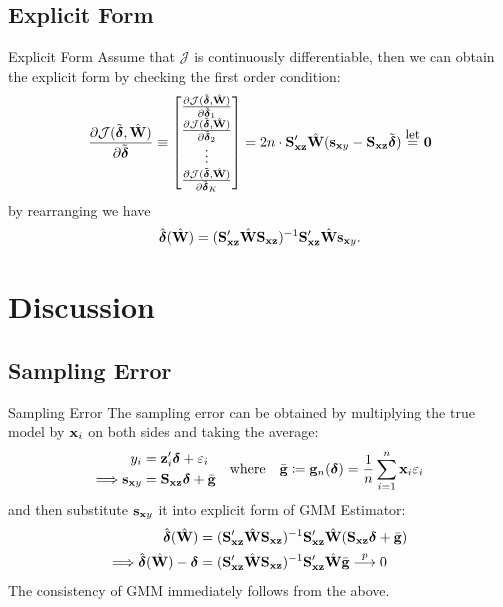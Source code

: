 \documentclass{beamer}
\begin{document}
\subsection{Explicit Form}

\begin{frame}{Explicit Form}
	Assume that $\mathcal{J}$ is continuously differentiable,
	then we can obtain the explicit form by checking the first order condition:
	\begin{align*}
		\frac{\partial{\mathcal{J}(\tilde{\boldsymbol{\delta}},\hat{\mathbf{W}})}}{\partial{\tilde{\boldsymbol{\delta}}}}
		\equiv
		\begin{bmatrix}
			\frac{\partial{\mathcal{J}(\tilde{\boldsymbol{\delta}},\hat{\mathbf{W}})}}{\partial{\tilde{\boldsymbol{\delta}}_1}} \\
			\frac{\partial{\mathcal{J}(\tilde{\boldsymbol{\delta}},\hat{\mathbf{W}})}}{\partial{\tilde{\boldsymbol{\delta}}_2}} \\
			\vdots \\
			\frac{\partial{\mathcal{J}(\tilde{\boldsymbol{\delta}},\hat{\mathbf{W}})}}{\partial{\tilde{\boldsymbol{\delta}}_K}} \\
		\end{bmatrix}
		= 2n\cdot\mathbf{S}_{\mathbf{x}\mathbf{z}}'\hat{\mathbf{W}}(\mathbf{s}_{\mathbf{x} y}-\mathbf{S}_{\mathbf{x}\mathbf{z}}\tilde{\boldsymbol{\delta}})
		\overset{\text{\small let}}{=} \mathbf{0}
	\end{align*}
	by rearranging we have
	\begin{align*}
		\hat{\boldsymbol{\delta}}(\hat{\mathbf{W}}) = (\mathbf{S}_{\mathbf{x}\mathbf{z}}'\hat{\mathbf{W}}\mathbf{S}_{\mathbf{x}\mathbf{z}})^{-1}\mathbf{S}_{\mathbf{x}\mathbf{z}}'\hat{\mathbf{W}}\mathbf{s}_{\mathbf{x} y}.
	\end{align*}
\end{frame}

\section{Discussion}

\subsection{Sampling Error}

\begin{frame}{Sampling Error}
	The sampling error can be obtained by multiplying the true model
	by $\mathbf{x}_i$ on both sides and taking the average:
	\begin{align*}
		\begin{aligned}
			y_i &= \mathbf{z}_i'\boldsymbol{\delta}+\varepsilon_i \\
			\Longrightarrow \mathbf{s}_{\mathbf{x} y} &= \mathbf{S}_{\mathbf{x}\mathbf{z}}\boldsymbol{\delta} + \bar{\mathbf{g}}
		\end{aligned}
		\quad\text{where}\quad
		\bar{\mathbf{g}} \coloneqq \mathbf{g}_n(\boldsymbol{\delta}) = \frac1n\sum_{i=1}^{n}\mathbf{x}_i\varepsilon_i
	\end{align*}
	and then substitute $\mathbf{s}_{\mathbf{x} y}$ it into explicit form of GMM Estimator:
	\begin{align*}
		\hat{\boldsymbol{\delta}}(\hat{\mathbf{W}})
		&= (\mathbf{S}_{\mathbf{x}\mathbf{z}}'\hat{\mathbf{W}}\mathbf{S}_{\mathbf{x}\mathbf{z}})^{-1}\mathbf{S}_{\mathbf{x}\mathbf{z}}'\hat{\mathbf{W}}(\mathbf{S}_{\mathbf{x}\mathbf{z}}\boldsymbol{\delta} + \bar{\mathbf{g}}) \nonumber \\
		\Longrightarrow \hat{\boldsymbol{\delta}}(\hat{\mathbf{W}}) - \boldsymbol{\delta}
		&= (\mathbf{S}_{\mathbf{x}\mathbf{z}}'\hat{\mathbf{W}}\mathbf{S}_{\mathbf{x}\mathbf{z}})^{-1}\mathbf{S}_{\mathbf{x}\mathbf{z}}'\hat{\mathbf{W}}\bar{\mathbf{g}} \overset{p}{\longrightarrow} 0
	\end{align*}
	The consistency of GMM immediately follows from the above.
\end{frame}
\end{document}
